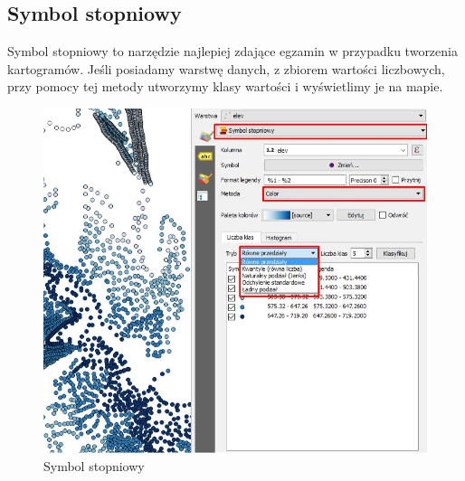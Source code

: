 \documentclass[12pt,a4paper]{book}
\begin{document}
\subsection{Symbol stopniowy}
Symbol stopniowy to narzędzie najlepiej zdające egzamin w przypadku tworzenia kartogramów. Jeśli posiadamy warstwę danych, z zbiorem wartości liczbowych, przy pomocy tej metody utworzymy klasy wartości i wyświetlimy je na mapie.
\begin{figure}[ht]
	\centering
	\includegraphics[scale=0.4]{007-wektor-stopniowy.png}
	\caption{Symbol stopniowy}
\end{figure}
\end{document}

